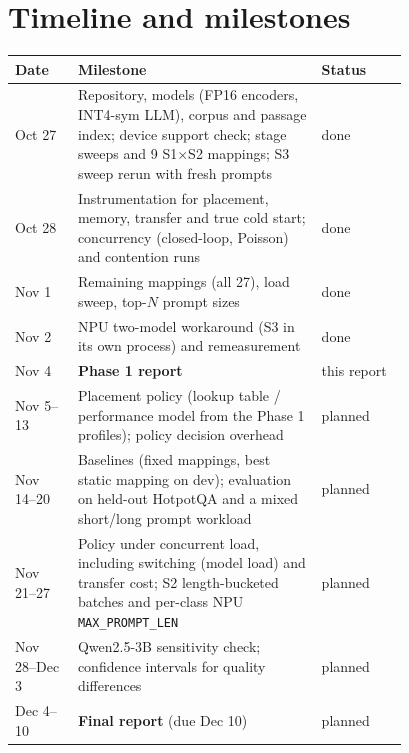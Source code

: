 \documentclass[10pt]{article}
\begin{document}
\appendix
\section{Timeline and milestones}
\begin{table}[h]\centering\small
\begin{tabular}{p{0.16\linewidth}p{0.62\linewidth}l}\toprule
Date & Milestone & Status\\\midrule
Oct 27 & Repository, models (FP16 encoders, INT4-sym LLM), corpus and passage index; device support check; stage sweeps and 9 S1$\times$S2 mappings; S3 sweep rerun with fresh prompts & done\\
Oct 28 & Instrumentation for placement, memory, transfer and true cold start; concurrency (closed-loop, Poisson) and contention runs & done\\
Nov 1 & Remaining mappings (all 27), load sweep, top-$N$ prompt sizes & done\\
Nov 2 & NPU two-model workaround (S3 in its own process) and remeasurement & done\\
Nov 4 & \textbf{Phase 1 report} & this report\\\midrule
Nov 5--13 & Placement policy (lookup table / performance model from the Phase 1 profiles); policy decision overhead & planned\\
Nov 14--20 & Baselines (fixed mappings, best static mapping on dev); evaluation on held-out HotpotQA and a mixed short/long prompt workload & planned\\
Nov 21--27 & Policy under concurrent load, including switching (model load) and transfer cost; S2 length-bucketed batches and per-class NPU \texttt{MAX\_PROMPT\_LEN} & planned\\
Nov 28--Dec 3 & Qwen2.5-3B sensitivity check; confidence intervals for quality differences & planned\\
Dec 4--10 & \textbf{Final report} (due Dec 10) & planned\\\bottomrule
\end{tabular}
\end{table}
\end{document}

